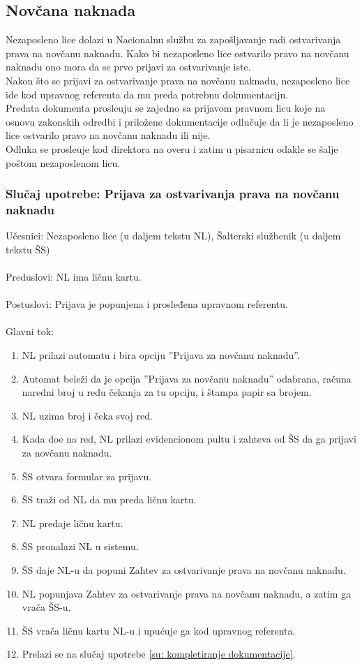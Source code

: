 \subsection{Nov\v cana naknada}

Nezaposleno lice dolazi u Nacionalnu slu\v zbu za zapo\v sljavanje radi ostvarivanja prava na nov\v canu naknadu. Kako bi nezaposleno lice ostvarilo pravo na nov\v canu naknadu ono mora da se prvo prijavi za ostvarivanje iste.
\\
Nakon \v sto se prijavi za ostvarivanje prava na nov\v canu naknadu, nezaposleno lice ide kod upravnog referenta da mu preda potrebnu dokumentaciju.
\\ Predata dokumenta prosle\dj uju se zajedno sa prijavom pravnom licu koje na osnovu zakonskih odredbi i priložene dokumentacije odlu\v cuje da li je nezaposleno lice ostvarilo pravo na nov\v canu naknadu ili nije.
\\
Odluka se prosle\dj uje kod direktora na overu i zatim u pisarnicu odakle se \v salje po\v stom nezaposlenom licu.

\subsubsection{Slu\v caj upotrebe: Prijava za ostvarivanja prava na nov\v canu naknadu}
\label{su: prijava}
\noindent Učesnici: Nezaposleno lice (u daljem tekstu NL), \v Salterski službenik (u daljem tekstu \v SS)
\\
\\ Preduslovi: NL ima ličnu kartu.
\\
\\ Postuslovi: Prijava je popunjena i prosleđena upravnom referentu.
\\
\\ Glavni tok:
\begin{enumerate}
\item NL prilazi automatu i bira opciju ''Prijava za novčanu naknadu''.
\item Automat bele\v zi da je opcija ''Prijava za novčanu naknadu'' odabrana, ra\v cuna naredni broj u redu \v cekanja za tu opciju, i \v stampa papir sa brojem.
\item NL uzima broj i \v ceka svoj red.
	\item Kada do\dj e na red, NL prilazi evidencionom pultu i zahteva od \v SS da ga prijavi za novčanu naknadu.
	\item \v SS otvara formular za prijavu.
	\item \v SS tra\v zi od NL da mu preda li\v cnu kartu.
	\item NL predaje li\v cnu kartu.
    \item \v SS pronalazi NL u sistemu.
	\item \v SS daje NL-u da popuni Zahtev za ostvarivanje prava na novčanu naknadu.
	\item NL popunjava Zahtev za ostvarivanje prava na novčanu naknadu, a zatim ga vra\v ca \v SS-u.
	\item \v SS vra\v ca ličnu kartu NL-u i upućuje ga kod upravnog referenta.
	\item Prelazi se na slu\v caj upotrebe \ref{su: kompletiranje dokumentacije}.
\end{enumerate}

